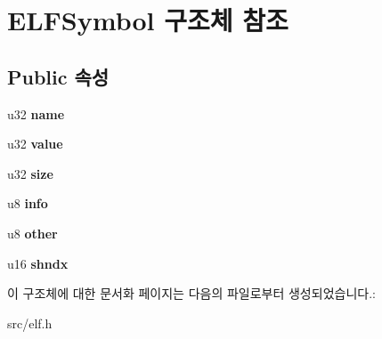 \hypertarget{struct_e_l_f_symbol}{}\section{E\+L\+F\+Symbol 구조체 참조}
\label{struct_e_l_f_symbol}
\subsection*{Public 속성}
\begin{DoxyCompactItemize}
\item 
\mbox{\label{struct_e_l_f_symbol_a976a529631ba267687dbd10db51c7d7f}} 
u32 {\bfseries name}
\item 
\mbox{\label{struct_e_l_f_symbol_ab2da134d25fef0ac7b83c49a5d0ada6c}} 
u32 {\bfseries value}
\item 
\mbox{\label{struct_e_l_f_symbol_a40bb6453d115f04dc63227dd6da7611f}} 
u32 {\bfseries size}
\item 
\mbox{\label{struct_e_l_f_symbol_a9cde1ecfa1e072a05540d6ffbb325335}} 
u8 {\bfseries info}
\item 
\mbox{\label{struct_e_l_f_symbol_a2ef76e3d315db14d758abd8e30235f8a}} 
u8 {\bfseries other}
\item 
\mbox{\label{struct_e_l_f_symbol_a66f166eed1f7e96da9bfdc8cee7d887d}} 
u16 {\bfseries shndx}
\end{DoxyCompactItemize}


이 구조체에 대한 문서화 페이지는 다음의 파일로부터 생성되었습니다.\+:\begin{DoxyCompactItemize}
\item 
src/elf.\+h\end{DoxyCompactItemize}
